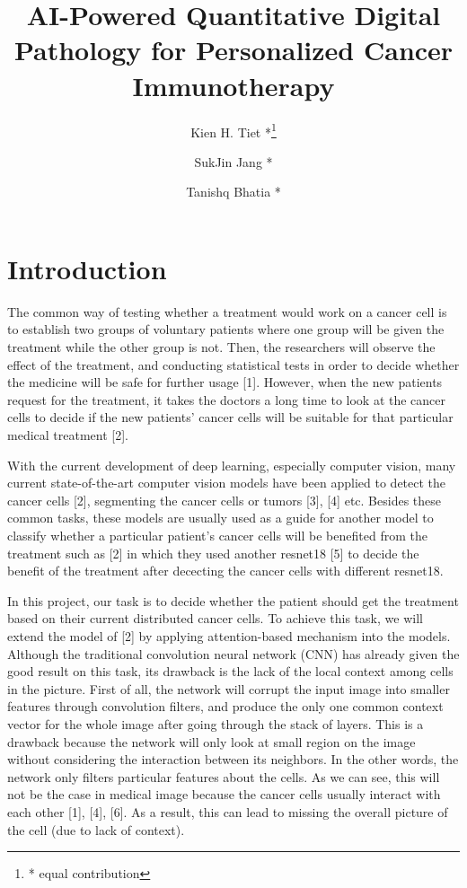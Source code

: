 \documentclass[letterpaper, 11 pt, journal]{ieeeconf}
\title{\LARGE \bf AI-Powered Quantitative Digital Pathology for Personalized Cancer Immunotherapy}
\author[1]{Kien H. Tiet *\thanks{* equal contribution}}
\author[1]{SukJin Jang *}
\author[1]{Tanishq Bhatia *}
\affil[1]{University of California, Los Angeles}
\begin{document}
	
	\maketitle
	\thispagestyle{empty}
	\pagestyle{empty}

	\section{Introduction}

	The common way of testing whether a treatment would work on a cancer cell is to establish two groups of voluntary patients where one group 
	will be given the treatment while the other group is not. Then, the researchers will observe the effect of the treatment, and conducting 
	statistical tests in order to decide whether the medicine will be safe for further usage [1]. However, when the new patients request for
	the treatment, it takes the doctors a long time to look at the cancer cells to decide if the new patients' cancer cells will be suitable for 
	that particular medical treatment [2].

	With the current development of deep learning, especially computer vision, many current state-of-the-art computer vision models have been applied to 
	detect the cancer cells [2], segmenting the cancer cells or tumors [3], [4] etc. Besides these common tasks, these models are usually used as a guide 
	for another model to classify whether a particular patient's cancer cells will be benefited from the treatment such as [2] in which they used 
	another resnet18 [5] to decide the benefit of the treatment after dececting the cancer cells with different resnet18.
		
	In this project, our task is to decide whether the patient should get the treatment based on their current distributed cancer cells. To achieve this
	task, we will extend the model of [2] by applying attention-based mechanism into the models. Although the traditional convolution neural network (CNN)
	has already given the good result on this task, its drawback is the lack of the local context among cells in the picture. First of all, 
	the network will corrupt the input image into smaller features through convolution filters, and produce the only one common context vector for the whole 
	image after going through the stack of layers. This is a drawback because the network will only look at small region on the image without considering 
	the interaction between its neighbors. In the other words, the network only filters particular features about the cells. As we can see, this will not 
	be the case in medical image because the cancer cells usually interact with each other [1], [4], [6]. 
	As a result, this can lead to missing the overall picture of the cell (due to lack of context). 
	
\end{document}
